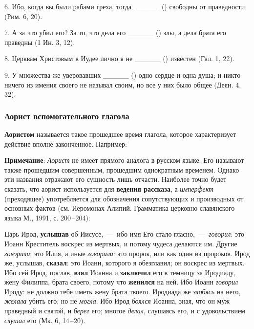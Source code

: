 \documentclass[11pt,a4paper,oneside]{memoir}
\newcommand{\hspca}{\hspace{2.4em}}
\begin{document}
  6. Ибо, когда вы были рабами греха, тогда _____ ({})
  свободны от праведности (Рим. 6, 20).

  7. А за что убил его? За то, что дела его _____ ({})
  злы, а дела брата его праведны (1 Ин. 3, 12).

  8. Церквам Христовым в Иудее лично я не _____ ({})
  известен (Гал. 1, 22).

  9. У множества же уверовавших _____ ({}) одно сердце и
  одна душа; и никто ничего из имения своего не называл своим, но все
  у них было общее (Деян. 4, 32).

  \subsubsection{Аорист вспомогательного глагола {}}

  \textbf{Аористом} называется такое прошедшее время глагола, которое
  характеризует действие вполне законченное. Например:

  \bigskip\autorows{l}{1}{l}{
    \hspca{{\slv{То́й речѐ и҆}} {\slv{\large бы́ша}} (Пс. 32, 9)}
  }

  \textbf{Примечание}: \emph{Аорист} не имеет прямого аналога в
  русском языке. Его называют также прошедшим совершенным, прошедшим
  однократным временем. Однако эти названия отражают его сущность
  лишь отчасти. Наиболее точно будет сказать, что аорист используется
  для \textbf{ведения рассказа}, а \emph{имперфект} (преходящее)
  употребляется для обозначения сопутствующих и производных от
  основных фактов (см. Иеромонах Алипий. Грамматика
  церковно-славянского языка М., 1991, с. 200\,--204):

  Царь Ирод, \textbf{услышав} об Иисусе,~---~ибо имя Его стало
  гласно,~---~\emph{говорил}: это Иоанн Креститель воскрес из
  мертвых, и потому чудеса делаются им. Другие \emph{говорили}: это
  Илия, а иные \emph{говорили}: это пророк, или как один из пророков.
  Ирод же, услышав, \textbf{сказал}: это Иоанн, которого я
  обезглавил; он воскрес из мертвых. Ибо сей Ирод, послав,
  \textbf{взял} Иоанна и \textbf{заключил} его в темницу за Иродиаду,
  жену Филиппа, брата своего, потому что \textbf{женился} на ней. Ибо
  Иоанн \emph{говорил} Ироду: не должно тебе иметь жену брата твоего.
  Иродиада же \emph{злобясь} на него, \emph{желала} убить его; но не
  \emph{могла}. Ибо Ирод \emph{боялся} Иоанна, зная, что он муж
  праведный и святой, и \emph{берег} его; многое \emph{делал},
  слушаясь его, и с удовольствием \emph{слушал} его (Мк. 6, 14\,--20).
  \pagebreak
\end{document}
